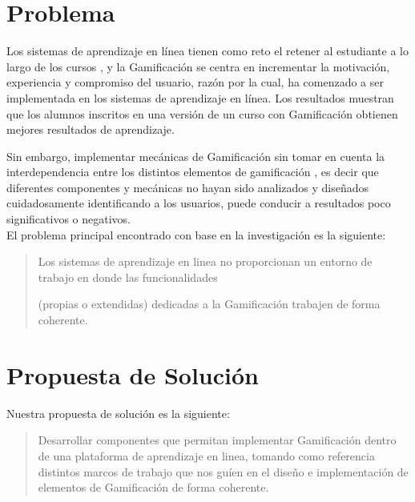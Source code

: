 \section{Problema}
\label{sec:problematica}

Los sistemas de aprendizaje en línea tienen como reto el retener al estudiante a lo largo de los cursos \cite{problematica1}, y la Gamificación se centra en incrementar la motivación, experiencia y compromiso del usuario, razón por la cual, ha comenzado a ser implementada en los sistemas de aprendizaje en línea. Los resultados muestran que los alumnos inscritos en una versión de un curso con Gamificación obtienen mejores resultados de aprendizaje. \cite{problematica2}\\
    
\noindent Sin embargo, implementar mecánicas de Gamificación sin tomar en cuenta la interdependencia entre los distintos elementos de gamificación \cite[p. ]{FrameWorkForTheWin}, es decir que diferentes componentes y mecánicas no hayan sido analizados y diseñados cuidadosamente identificando a los usuarios, puede conducir a resultados poco significativos o negativos. \cite{problematica3}\\
    
    \noindent El problema principal encontrado con base en la investigación es la siguiente:
    
    \begin{quote}
    \colorbox{blue!05}{\parbox{\dimexpr\linewidth-2\fboxsep}{\strut
    
        Los sistemas de aprendizaje en linea no proporcionan un entorno de
        trabajo en donde las funcionalidades\par (propias o extendidas) 
        dedicadas a la Gamificación trabajen de forma coherente\cite{coherencia}.
        
    \strut}}%
    \end{quote}

\section{Propuesta de Solución}
\label{sec:propuesta}

    Nuestra propuesta de solución es la siguiente:
    \begin{quote}
    \colorbox{blue!05}{\parbox{\dimexpr\linewidth-2\fboxsep}{\strut
        Desarrollar componentes que permitan implementar Gamificación dentro de una plataforma de aprendizaje en linea, tomando como referencia distintos marcos de trabajo que nos guíen en el diseño e implementación de elementos de Gamificación de forma coherente. 
    \strut}}
    \end{quote}

